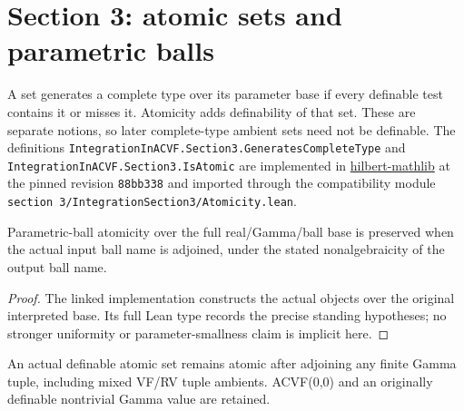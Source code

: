 \section{Section 3: atomic sets and parametric balls}


\begin{definition}

\label{s3-atomic}

\leanok

A set generates a complete type over its parameter base if every definable test contains it or misses it. Atomicity adds definability of that set. These are separate notions, so later complete-type ambient sets need not be definable. The definitions \texttt{IntegrationInACVF.Section3.GeneratesCompleteType} and \texttt{IntegrationInACVF.Section3.IsAtomic} are implemented in \href{https://github.com/daviddhilbert/hilbert-mathlib/blob/88bb3386f616779bfd87eb453d8a7c899ad63961/HilbertMathlib/Foundation/ModelTheory/Atomicity.lean#L34-L39}{hilbert-mathlib} at the pinned revision \texttt{88bb338} and imported through the compatibility module \texttt{section 3/IntegrationSection3/Atomicity.lean}.

\end{definition}

\begin{lemma}

\label{s3-2}


\leanok

Parametric-ball atomicity over the full real/Gamma/ball base is preserved when the actual input ball name is adjoined, under the stated nonalgebraicity of the output ball name.

\end{lemma}

\begin{proof}


\leanok

The linked implementation constructs the actual objects over the original interpreted base. Its full Lean type records the precise standing hypotheses; no stronger uniformity or parameter-smallness claim is implicit here.

\end{proof}

\begin{lemma}

\label{s3-3}


\leanok

An actual definable atomic set remains atomic after adjoining any finite Gamma tuple, including mixed VF/RV tuple ambients. ACVF(0,0) and an originally definable nontrivial Gamma value are retained.

\end{lemma}

